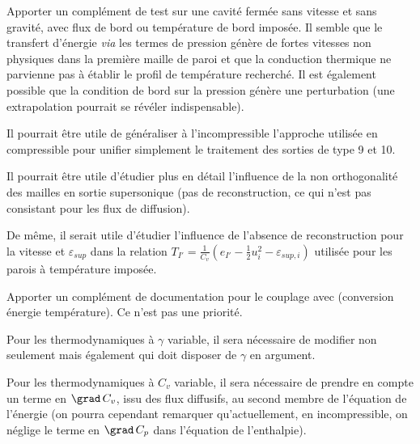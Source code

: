 Apporter un complément de test sur une cavité fermée
sans vitesse et sans gravité, avec flux de bord ou température de bord imposée.
Il semble que le transfert d'énergie {\it via} les termes de pression génère de
fortes vitesses non physiques dans la première maille de paroi et que la
conduction thermique ne parvienne pas à établir le profil de température
recherché. Il est également possible que la condition de bord sur la pression
génère une perturbation (une extrapolation pourrait se révéler
indispensable).

Il pourrait être utile de généraliser à l'incompressible l'approche
utilisée en compressible pour unifier simplement le traitement
des sorties de type 9 et 10.

Il pourrait être utile d'étudier plus en détail l'influence de la non
orthogonalité des mailles en sortie supersonique (pas de reconstruction,
ce qui n'est pas consistant pour les flux de diffusion).

De même, il serait utile d'étudier l'influence de l'absence de
reconstruction pour la vitesse et $\varepsilon_{sup}$ dans la relation
$\displaystyle T_{I'}=\frac{1}{C_v}\left(e_{I'}-\frac{1}{2}u^2_{i}-\varepsilon_{sup,i}\right)$
utilisée pour les parois à température imposée.

Apporter un complément de documentation pour le couplage avec \syrthes (conversion
énergie température). Ce n'est pas une priorité.

Pour les thermodynamiques à $\gamma$ variable, il sera nécessaire de
modifier non
seulement  mais également  qui doit disposer de
$\gamma$ en argument.

Pour les thermodynamiques à $C_v$ variable, il sera nécessaire de
prendre en compte un terme en $\grad\,C_v$, issu des flux diffusifs,
au second membre de l'équation de
l'énergie (on pourra cependant remarquer qu'actuellement, en incompressible,
on néglige le terme en $\grad\,C_p$ dans l'équation de l'enthalpie).

